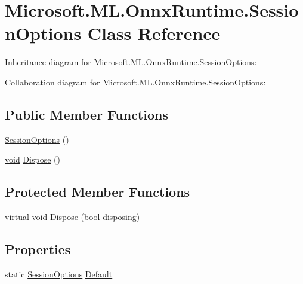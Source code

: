 \hypertarget{classMicrosoft_1_1ML_1_1OnnxRuntime_1_1SessionOptions}{}\section{Microsoft.\+M\+L.\+Onnx\+Runtime.\+Session\+Options Class Reference}
\label{classMicrosoft_1_1ML_1_1OnnxRuntime_1_1SessionOptions}


Inheritance diagram for Microsoft.\+M\+L.\+Onnx\+Runtime.\+Session\+Options\+:


Collaboration diagram for Microsoft.\+M\+L.\+Onnx\+Runtime.\+Session\+Options\+:
\subsection*{Public Member Functions}
\begin{DoxyCompactItemize}
\item 
\mbox{\hyperlink{classMicrosoft_1_1ML_1_1OnnxRuntime_1_1SessionOptions_a3661a9f1fde8ab9a61e4dd23d8d0d2c2}{Session\+Options}} ()
\item 
\mbox{\hyperlink{mlasi_8h_a88f941d423cb2a819b70a1358982b1a6}{void}} \mbox{\hyperlink{classMicrosoft_1_1ML_1_1OnnxRuntime_1_1SessionOptions_a12d86d50f88f574c5b53e1f590789dd3}{Dispose}} ()
\end{DoxyCompactItemize}
\subsection*{Protected Member Functions}
\begin{DoxyCompactItemize}
\item 
virtual \mbox{\hyperlink{mlasi_8h_a88f941d423cb2a819b70a1358982b1a6}{void}} \mbox{\hyperlink{classMicrosoft_1_1ML_1_1OnnxRuntime_1_1SessionOptions_a819d352e4cb1b184406f7b5675ca375a}{Dispose}} (bool disposing)
\end{DoxyCompactItemize}
\subsection*{Properties}
\begin{DoxyCompactItemize}
\item 
static \mbox{\hyperlink{classMicrosoft_1_1ML_1_1OnnxRuntime_1_1SessionOptions}{Session\+Options}} \mbox{\hyperlink{classMicrosoft_1_1ML_1_1OnnxRuntime_1_1SessionOptions_a5d7a7caba7db404be9962c42cb4d35be}{Default}}
\end{DoxyCompactItemize}


